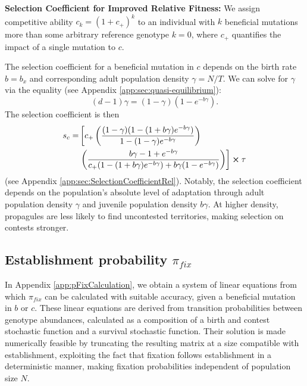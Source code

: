 \documentclass[9pt,twocolumn,twoside,lineno]{gsajnl}
\begin{document}
\textbf{Selection Coefficient for Improved Relative Fitness:}
We assign competitive ability $c_k = (1+c_{+})^k$ to an individual with $k$ beneficial mutations more than some arbitrary reference genotype $k=0$,  where $c_{+}$ quantifies the impact of a single mutation to $c$. 

The selection coefficient for a beneficial mutation in $c$ depends on the birth rate $b = b_x$ and corresponding adult population density $\gamma = N/T$. We can solve for $\gamma$ via the equality (see Appendix \ref{app:sec:quasi-equilibrium}): 
\begin{equation}\label{eq:eqPopSize}
    (d - 1)\gamma = (1-\gamma)(1-e^{-b\gamma}).
\end{equation} 
The selection coefficient is then 
\begin{equation}\label{eq:selCoeffRel}
\begin{aligned}
s_c =& \left[ c_+ \left(\frac{(1-\gamma)(1-(1+b\gamma)e^{-b\gamma})}{1-(1-\gamma)e^{-b\gamma}}\right)\right.\\
&\left. \left( \frac{b\gamma-1+e^{-b\gamma}}{{c_+(1-(1+b\gamma)e^{-b\gamma})}+{b\gamma(1-e^{-b\gamma})}}\right) \right] \cross \tau
\end{aligned}
\end{equation}
(see Appendix \ref{app:sec:SelectionCoefficientRel}). Notably, the selection coefficient depends on the population's absolute level of adaptation through adult population density $\gamma$ and juvenile population density $b \gamma$. At higher density, propagules are less likely to find uncontested territories, making selection on contests stronger. 

\subsection{Establishment probability $\pi_{fix}$}\label{sec:EstablishmentProbability}
In Appendix \ref{app:pFixCalculation}, we obtain a system of linear equations from which $\pi_{fix}$ can be calculated with suitable accuracy, given a beneficial mutation in $b$ or $c$. These linear equations are derived from transition probabilities between genotype abundances, calculated as a composition of a birth and contest stochastic function and a survival stochastic function. Their solution is made numerically feasible by truncating the resulting matrix at a size compatible with establishment, exploiting the fact that fixation follows establishment in a deterministic manner, making fixation probabilities independent of population size $N$. 
\end{document}

